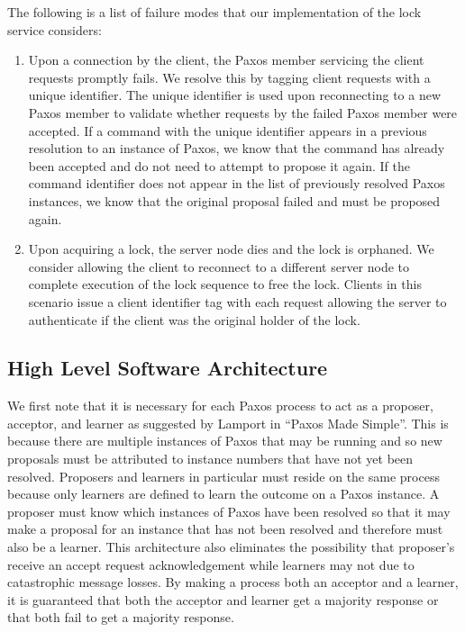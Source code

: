 \documentclass{article}
\begin{document}
The following is a list of failure modes that our implementation of the lock service considers:

\begin{enumerate}
\item Upon a connection by the client, the Paxos member servicing the client requests promptly fails. 
  We resolve this by tagging client requests with a unique identifier.
  The unique identifier is used upon reconnecting to a new Paxos member to validate whether requests by the failed Paxos member were accepted.
  If a command with the unique identifier appears in a previous resolution to an instance of Paxos, we know that the command has already been accepted and do not need to attempt to propose it again.
  If the command identifier does not appear in the list of previously resolved Paxos instances, we know that the original proposal failed and must be proposed again.
\item Upon acquiring a lock, the server node dies and the lock is orphaned.
  We consider allowing the client to reconnect to a different server node to complete execution of the lock sequence to free the lock.
  Clients in this scenario issue a client identifier tag with each request allowing the server to authenticate if the client was the original holder of the lock.
\end{enumerate}

\subsection{High Level Software Architecture}

We first note that it is necessary for each Paxos process to act as a proposer, acceptor, and learner as suggested by Lamport in ``Paxos Made Simple''.
This is because there are multiple instances of Paxos that may be running and so new proposals must be attributed to instance numbers that have not yet been resolved.
Proposers and learners in particular must reside on the same process because only learners are defined to learn the outcome on a Paxos instance.
A proposer must know which instances of Paxos have been resolved so that it may make a proposal for an instance that has not been resolved and therefore must also be a learner.
This architecture also eliminates the possibility that proposer's receive an accept request acknowledgement while learners may not due to catastrophic message losses.
By making a process both an acceptor and a learner, it is guaranteed that both the acceptor and learner get a majority response or that both fail to get a majority response.
\end{document}
